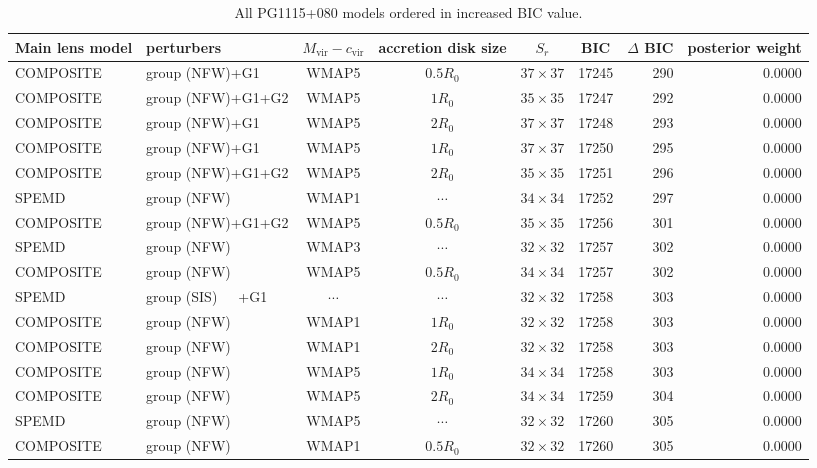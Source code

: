 \documentclass[useAMS,usenatbib]{mnras}
\def\nomicro{$\cdots$}
\def\nodata{$\cdots$}
\begin{document}
\begin{table}
    \centering
    \caption{All PG1115+080 models ordered in increased BIC value.}
    \label{tab:6TD_4}
    \begin{tabular}{llccccrr}
        \hline
        Main lens model & perturbers &$M_{\textrm{vir}}-c_{\textrm{vir}}$& accretion disk size & $S_{r}$ & BIC & $\Delta$ BIC & posterior weight\\
        \hline
        COMPOSITE & group (NFW)+G1    &WMAP5 & $0.5R_{0}$&$37\times37$ & 17245 & 290 & 0.0000\\
        COMPOSITE & group (NFW)+G1+G2 &WMAP5 & $1R_{0}$&$35\times35$ & 17247 & 292 & 0.0000\\
        COMPOSITE & group (NFW)+G1    &WMAP5 & $2R_{0}$&$37\times37$ & 17248 & 293 & 0.0000\\
        COMPOSITE & group (NFW)+G1    &WMAP5 & $1R_{0}$&$37\times37$ & 17250 & 295 & 0.0000\\
        COMPOSITE & group (NFW)+G1+G2 &WMAP5 & $2R_{0}$&$35\times35$ & 17251 & 296 & 0.0000\\
        SPEMD     & group (NFW)       &WMAP1 & \nomicro&$34\times34$ & 17252 & 297 & 0.0000\\
        COMPOSITE & group (NFW)+G1+G2 &WMAP5 & $0.5R_{0}$&$35\times35$ & 17256 & 301 & 0.0000\\
        SPEMD     & group (NFW)       &WMAP3 & \nomicro&$32\times32$ & 17257 & 302 & 0.0000\\
        COMPOSITE & group (NFW)       &WMAP5 & $0.5R_{0}$&$34\times34$ & 17257 & 302 & 0.0000\\
        SPEMD     & group (SIS)~~~+G1 &\nodata& \nomicro&$32\times32$ & 17258 & 303 & 0.0000\\
        COMPOSITE & group (NFW)       &WMAP1 & $1R_{0}$&$32\times32$ & 17258 & 303 & 0.0000\\
        COMPOSITE & group (NFW)       &WMAP1 & $2R_{0}$&$32\times32$ & 17258 & 303 & 0.0000\\
        COMPOSITE & group (NFW)       &WMAP5 & $1R_{0}$&$34\times34$ & 17258 & 303 & 0.0000\\
        COMPOSITE & group (NFW)       &WMAP5 & $2R_{0}$&$34\times34$ & 17259 & 304 & 0.0000\\
        SPEMD     & group (NFW)       &WMAP5 & \nomicro&$32\times32$ & 17260 & 305 & 0.0000\\
        COMPOSITE & group (NFW)       &WMAP1 & $0.5R_{0}$&$32\times32$ & 17260 & 305 & 0.0000\\

\end{tabular}
\end{table}
\end{document}
